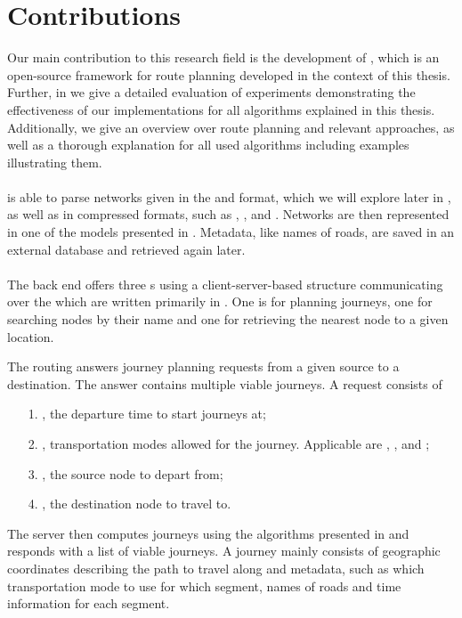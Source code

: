 \section{Contributions}
	Our main contribution to this research field is the development of \cobweb {}, which is an open-source
	framework for \multiModal route planning developed in the context of this thesis. Further, in 
	we give a detailed evaluation of experiments demonstrating the effectiveness of our implementations for all algorithms
	explained in this thesis. Additionally, we give an overview over route planning and relevant approaches, as well as a
	thorough explanation for all used algorithms including examples illustrating them.\\\\
	\cobweb is able to parse networks given in the \osm and \gtfs format, which we will explore later in , as well as
	in compressed formats, such as \bzipTwo {}, \gzip {}, \zip {} and \xz {}.
	Networks are then represented in one of the models presented in . Metadata, like names of roads, are saved in an external
	database and retrieved again later.\\\\
	The back end offers three {\restApi}s  using a client-server-based structure communicating over the \http {} which
	are written primarily in \java.
	One \api is for planning journeys, one for searching nodes by their name and one for retrieving the nearest node to a given location.
	
	The routing \api answers journey planning requests from a given source to a destination. The answer contains multiple viable journeys.
	A request consists of
	\begin{itemize}
		\item[1.] \depTime, the departure time to start journeys at;
		\item[2.] \modes, transportation modes allowed for the journey. Applicable are \car, \bike, \foot and \tram;
		\item[3.] \fromJ, the source node to depart from;
		\item[4.] \toJ, the destination node to travel to.
	\end{itemize}
	The server then computes journeys using the algorithms presented in  and responds with a list of viable
	journeys. A journey mainly consists of geographic coordinates describing the path to travel along and metadata, such as which
	transportation mode to use for which segment, names of roads and time information for each segment.
	

